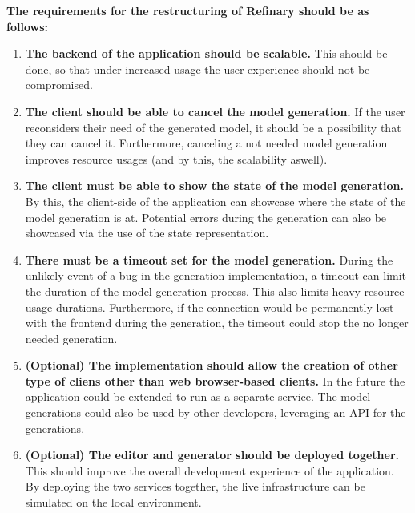 \textbf{The requirements for the restructuring of Refinary should be as follows:}
\begin{enumerate}
        \item \textbf{The backend of the application should be scalable.} This should be done, so that under increased usage 
		the user experience should not be compromised.
        \item \textbf{The client should be able to cancel the model generation.} If the user reconsiders their need of the 
		generated model, it should be a possibility that they can cancel it. Furthermore, canceling a not needed model generation 
		improves resource usages (and by this, the scalability aswell).
        \item \textbf{The client must be able to show the state of the model generation.} By this, the client-side of the application can showcase
        where the state of the model generation is at. Potential errors during the generation can also be showcased via the use of the state representation.
        \item \textbf{There must be a timeout set for the model generation.} During the unlikely event of a bug in the generation implementation, 
		a timeout can limit the duration of the model generation process. This also limits heavy resource usage durations. Furthermore, if the connection would be 
		permanently lost with the frontend during the generation, the timeout could stop the no longer needed generation.
		\item \textbf{(Optional) The implementation should allow the creation of other type of cliens other than web browser-based clients.} In the future
		the application could be extended to run as a separate service. The model generations could also be used by other developers, leveraging an API for the
		generations.
		\item \textbf{(Optional) The editor and generator should be deployed together.} This should improve the overall development experience of the application.
		By deploying the two services together, the live infrastructure can be simulated on the local environment.
\end{enumerate}


